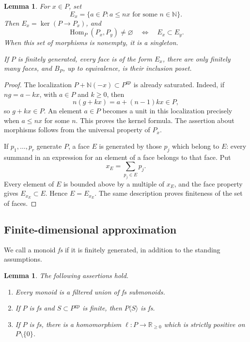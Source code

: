 \documentclass[11pt]{article}
\newtheorem{lemma}[theorem]{Lemma}
\theoremstyle{definition}
\theoremstyle{remark}
\DeclareMathOperator{\Hom}{Hom}
\newcommand{\gp}{\mathrm{gp}}
\newcommand{\NN}{\mathbb N}
\newcommand{\RR}{\mathbb R}
\begin{document}
\begin{lemma}\label{lem:faces}
For \(x\in P\), set
\[
E_x=\{a\in P:a\le nx\text{ for some }n\in\NN\}.
\]
Then \(E_x=\ker(P\to P_x)\), and
\[
\Hom_P(P_x,P_y)\ne\varnothing
\quad\Longleftrightarrow\quad E_x\subset E_y.
\]
When this set of morphisms is nonempty, it is a singleton.

If \(P\) is finitely generated, every face is of the form \(E_x\),
there are only finitely many faces, and \(B_P\), up to equivalence,
is their inclusion poset.
\end{lemma}

\begin{proof}
The localization \(P+\NN(-x)\subset P^{\gp}\) is already saturated.
Indeed, if \(ng=a-kx\), with \(a\in P\) and \(k\ge0\), then
\[
n(g+kx)=a+(n-1)kx\in P,
\]
so \(g+kx\in P\). An element \(a\in P\) becomes a unit in this
localization precisely when \(a\le nx\) for some \(n\).
This proves the kernel formula. The assertion about morphisms
follows from the universal property of \(P_x\).

If \(p_1,\ldots,p_r\) generate \(P\), a face \(E\) is generated by
those \(p_j\) which belong to \(E\): every summand in an expression
for an element of a face belongs to that face. Put
\[
x_E=\sum_{p_j\in E}p_j.
\]
Every element of \(E\) is bounded above by a multiple of \(x_E\),
and the face property gives \(E_{x_E}\subset E\). Hence
\(E=E_{x_E}\). The same description proves finiteness of the set of
faces.
\end{proof}

\subsection{Finite-dimensional approximation}

We call a monoid \emph{fs} if it is finitely generated, in addition
to the standing assumptions.

\begin{lemma}\label{lem:fs}
The following assertions hold.
\begin{enumerate}[label=\textup{(\roman*)}]
\item Every monoid is a filtered union of fs submonoids.
\item If \(P\) is fs and \(S\subset P^{\gp}\) is finite, then
\(P\langle S\rangle\) is fs.
\item If \(P\) is fs, there is a homomorphism
\(\ell:P\to\RR_{\ge0}\) which is strictly positive on
\(P\setminus\{0\}\).
\end{enumerate}
\end{lemma}
\end{document}
